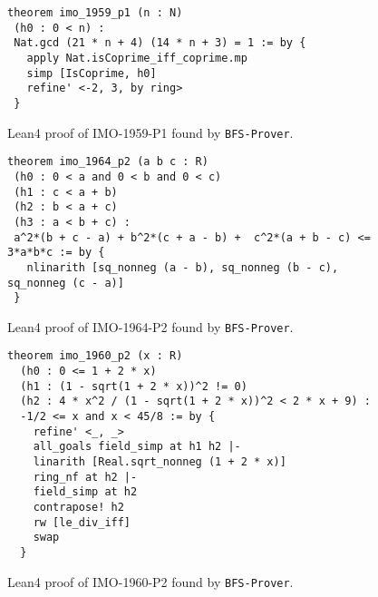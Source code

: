 \documentclass[10pt,english]{article}
\begin{document}
\begin{figure*}[htbp]
\begin{minipage}{\textwidth}
\begin{Verbatim}[frame=single,framesep=3mm,framerule=0.5mm]
theorem imo_1959_p1 (n : N)
 (h0 : 0 < n) :
 Nat.gcd (21 * n + 4) (14 * n + 3) = 1 := by {
   apply Nat.isCoprime_iff_coprime.mp
   simp [IsCoprime, h0]
   refine' <-2, 3, by ring>
 }
\end{Verbatim}
\caption{Lean4 proof of IMO-1959-P1 found by \texttt{BFS-Prover}.}
\label{fig:imo1959p1}
\end{minipage}
\end{figure*}

\begin{figure*}[htbp]
\begin{minipage}{\textwidth}
\begin{Verbatim}[frame=single,framesep=3mm,framerule=0.5mm]
theorem imo_1964_p2 (a b c : R)
 (h0 : 0 < a and 0 < b and 0 < c)
 (h1 : c < a + b)
 (h2 : b < a + c)
 (h3 : a < b + c) :
 a^2*(b + c - a) + b^2*(c + a - b) +  c^2*(a + b - c) <= 3*a*b*c := by {
   nlinarith [sq_nonneg (a - b), sq_nonneg (b - c), sq_nonneg (c - a)]
 }
\end{Verbatim}
\caption{Lean4 proof of IMO-1964-P2 found by \texttt{BFS-Prover}.}
\label{fig:imo1964p2}
\end{minipage}
\end{figure*}

\begin{figure*}[htbp]
\begin{minipage}{\textwidth}
\begin{Verbatim}[frame=single,framesep=3mm,framerule=0.5mm]
theorem imo_1960_p2 (x : R)
  (h0 : 0 <= 1 + 2 * x)
  (h1 : (1 - sqrt(1 + 2 * x))^2 != 0)
  (h2 : 4 * x^2 / (1 - sqrt(1 + 2 * x))^2 < 2 * x + 9) :
  -1/2 <= x and x < 45/8 := by {
    refine' <_, _>
    all_goals field_simp at h1 h2 |-
    linarith [Real.sqrt_nonneg (1 + 2 * x)]
    ring_nf at h2 |-
    field_simp at h2
    contrapose! h2
    rw [le_div_iff]
    swap
  }
\end{Verbatim}
\caption{Lean4 proof of IMO-1960-P2 found by \texttt{BFS-Prover}.}
\label{fig:imo1960p2}
\end{minipage}
\end{figure*}
\end{document}
